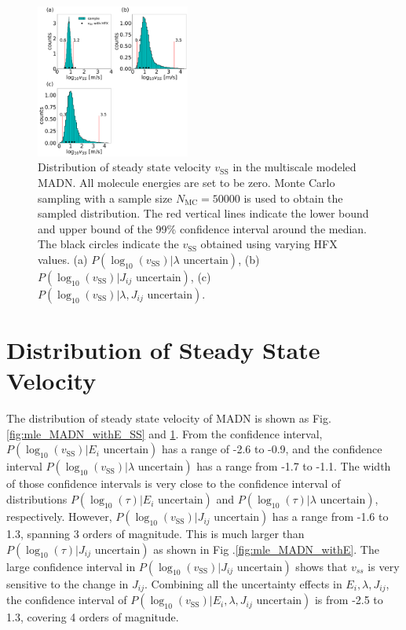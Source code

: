 \documentclass[%
 reprint,
 amsmath,amssymb,
 aps,
]{revtex4-2}
\begin{document}
\begin{figure}
  \centering
  \includegraphics[width=0.45\textwidth]{figs/fig_mle_MADN_noE_SS.pdf}
  \caption{Distribution of steady state velocity $v_\text{SS}$ in the multiscale modeled MADN. All molecule energies are set to be zero.  
  Monte Carlo sampling with a sample size $N_\text{MC}=50000$ is used to obtain the sampled distribution.
  The red vertical lines indicate the lower bound and upper bound of the 99\% confidence interval around the median.
  The black circles indicate the $v_\text{SS}$ obtained using varying HFX values.
  (a) $P(\log_{10}(v_\text{SS})|\lambda \text{ uncertain})$, 
  (b) $P(\log_{10}(v_\text{SS})|J_{ij} \text{ uncertain})$, 
  (c) $P(\log_{10}(v_\text{SS})|\lambda, J_{ij} \text{ uncertain})$.  }
  \label{fig:mle_MADN_noE_SS}
\end{figure}
%
\section{Distribution of Steady State Velocity}

The distribution of steady state velocity of MADN is shown as Fig.\ref{fig:mle_MADN_withE_SS} and \ref{fig:mle_MADN_noE_SS}. 
From the confidence interval, $P(\log_{10}(v_\text{SS})|E_i \text{ uncertain})$ has a range of -2.6 to -0.9, and the confidence interval $P(\log_{10}(v_\text{SS})|\lambda \text{ uncertain})$ has a range from -1.7 to -1.1. The width of those confidence intervals is very close to the confidence interval of distributions $P(\log_{10}(\tau)|E_i \text{ uncertain})$ and $P(\log_{10}(\tau)|\lambda \text{ uncertain})$, respectively.
However, $P(\log_{10}(v_\text{SS})|J_{ij} \text{ uncertain})$ has a range from -1.6 to 1.3, spanning 3 orders of magnitude. This is  much larger than $P(\log_{10}(\tau)|J_{ij} \text{ uncertain})$ as shown in Fig .\ref{fig:mle_MADN_withE}.  
The large confidence interval in $P(\log_{10}(v_\text{SS})|J_{ij} \text{ uncertain})$ shows that $v_{ss}$ is very sensitive to the change in $J_{ij}$. Combining all the uncertainty effects in $E_i, \lambda, J_{ij}$, the confidence interval of $P(\log_{10}(v_\text{SS})|E_i, \lambda, J_{ij} \text{ uncertain})$ is from -2.5 to 1.3, covering 4 orders of magnitude.  
\end{document}
